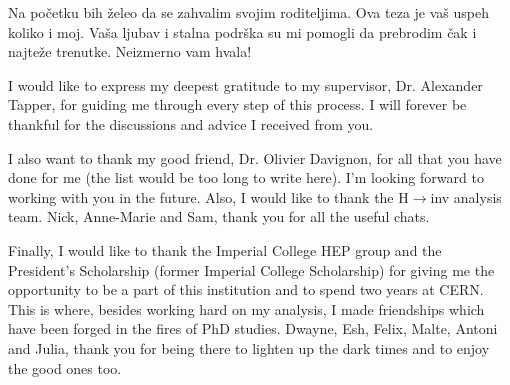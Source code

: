 
\cleardoublepage


\begin{acknowledgements}
\mediumlinespacing

\hspace{10pt} Na po\v{c}etku bih \v{z}eleo da se zahvalim svojim roditeljima. Ova teza je va\v{s} uspeh koliko i moj. Va\v{s}a ljubav i stalna podr\v{s}ka su mi pomogli da prebrodim \v{c}ak i najte\v{z}e trenutke. Neizmerno vam hvala! 

\hspace{10pt} I would like to express my deepest gratitude to my supervisor, Dr. Alexander Tapper, for guiding me through every step of this process. I will forever be thankful for the discussions and advice I received from you.

\hspace{10pt} I also want to thank my good friend, Dr. Olivier Davignon, for all that you have done for me (the list would be too long to write here). I'm looking forward to working with you in the future. Also, I would like to thank the H$\rightarrow$inv analysis team. Nick, Anne-Marie and Sam, thank you for all the useful chats.


\hspace{10pt} Finally, I would like to thank the Imperial College HEP group and the President's Scholarship (former Imperial College Scholarship) for giving me the opportunity to be a part of this institution and to spend two years at CERN. This is where, besides working hard on my analysis, I made friendships which have been forged in the fires of PhD studies. Dwayne, Esh, Felix, Malte, Antoni and Julia, thank you for being there to lighten up the dark times and to enjoy the good ones too.

\end{acknowledgements}
